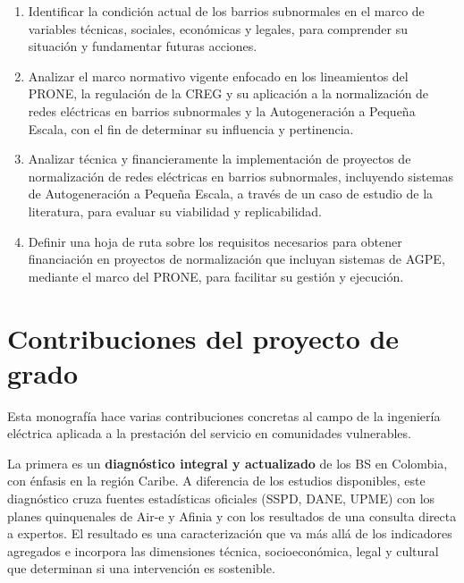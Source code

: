 \begin{enumerate}[label=\alph*), leftmargin=1.8cm, itemsep=6pt]

    \item Identificar la condición actual de los barrios subnormales en el marco de variables técnicas, sociales, económicas y legales, para comprender su situación y fundamentar futuras acciones.

    \item Analizar el marco normativo vigente enfocado en los lineamientos del PRONE, la regulación de la CREG y su aplicación a la normalización de redes eléctricas en barrios subnormales y la Autogeneración a Pequeña Escala, con el fin de determinar su influencia y pertinencia.

    \item Analizar técnica y financieramente la implementación de proyectos de normalización de redes eléctricas en barrios subnormales, incluyendo sistemas de Autogeneración a Pequeña Escala, a través de un caso de estudio de la literatura, para evaluar su viabilidad y replicabilidad.

    \item Definir una hoja de ruta sobre los requisitos necesarios para obtener financiación en proyectos de normalización que incluyan sistemas de AGPE, mediante el marco del PRONE, para facilitar su gestión y ejecución.

\end{enumerate}


\section{Contribuciones del proyecto de grado}
\label{sec:contribuciones}

Esta monografía hace varias contribuciones concretas al campo de la ingeniería eléctrica aplicada a la prestación del servicio en comunidades vulnerables.

La primera es un \textbf{diagnóstico integral y actualizado} de los BS en Colombia, con énfasis en la región Caribe. A diferencia de los estudios disponibles, este diagnóstico cruza fuentes estadísticas oficiales (SSPD, DANE, UPME) con los planes quinquenales de Air-e y Afinia y con los resultados de una consulta directa a expertos. El resultado es una caracterización que va más allá de los indicadores agregados e incorpora las dimensiones técnica, socioeconómica, legal y cultural que determinan si una intervención es sostenible.

